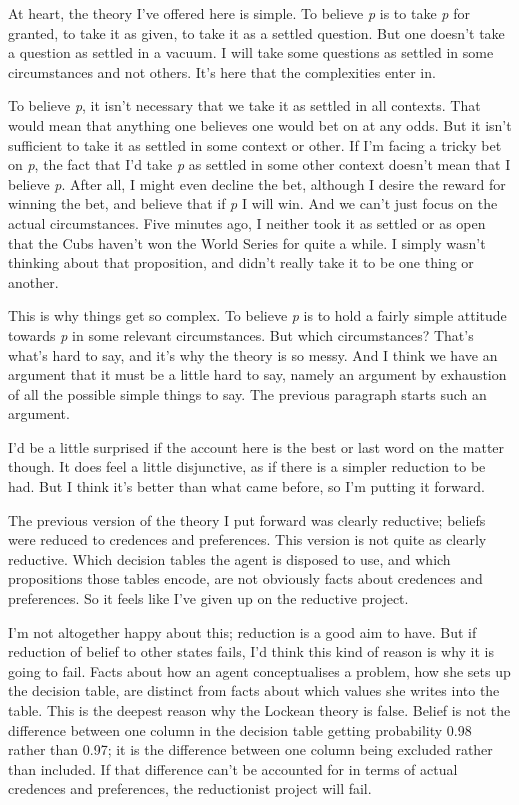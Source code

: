 At heart, the theory I've offered here is simple. To believe \emph{p} is to take \emph{p} for granted, to take it as given, to take it as a settled question. But one doesn't take a question as settled in a vacuum. I will take some questions as settled in some circumstances and not others. It's here that the complexities enter in.

To believe \emph{p}, it isn't necessary that we take it as settled in all contexts. That would mean that anything one believes one would bet on at any odds. But it isn't sufficient to take it as settled in some context or other. If I'm facing a tricky bet on \emph{p}, the fact that I'd take \emph{p} as settled in some other context doesn't mean that I believe \emph{p}. After all, I might even decline the bet, although I desire the reward for winning the bet, and believe that if \emph{p} I will win. And we can't just focus on the actual circumstances. Five minutes ago, I neither took it as settled or as open that the Cubs haven't won the World Series for quite a while. I simply wasn't thinking about that proposition, and didn't really take it to be one thing or another. 

This is why things get so complex. To believe \emph{p} is to hold a fairly simple attitude towards \emph{p} in some relevant circumstances. But which circumstances? That's what's hard to say, and it's why the theory is so messy. And I think we have an argument that it must be a little hard to say, namely an argument by exhaustion of all the possible simple things to say. The previous paragraph starts such an argument.

I'd be a little surprised if the account here is the best or last word on the matter though. It does feel a little disjunctive, as if there is a simpler reduction to be had. But I think it's better than what came before, so I'm putting it forward.

The previous version of the theory I put forward was clearly reductive; beliefs were reduced to credences and preferences. This version is not quite as clearly reductive. Which decision tables the agent is disposed to use, and which propositions those tables encode, are not obviously facts about credences and preferences. So it feels like I've given up on the reductive project.

I'm not altogether happy about this; reduction is a good aim to have. But if reduction of belief to other states fails, I'd think this kind of reason is why it is going to fail. Facts about how an agent conceptualises a problem, how she sets up the decision table, are distinct from facts about which values she writes into the table. This is the deepest reason why the Lockean theory is false. Belief is not the difference between one column in the decision table getting probability 0.98 rather than 0.97; it is the difference between one column being excluded rather than included. If that difference can't be accounted for in terms of actual credences and preferences, the reductionist project will fail.






